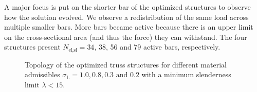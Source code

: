 A major focus is put on the shorter bar of the optimized structures to observe how the solution evolved. We observe a redistribution of the same load across multiple smaller bars. More bars became active because there is an upper limit on the cross-sectional area (and thus the force) they can withstand. The four structures present $N_\text{el,sl}=34$, 38, 56 and 79 active bars, respectively.

\begin{figure}
    \hfill
    \hfill
    \hfill
    \caption{Topology of the optimized truss structures for different material admissibles $\sigma_\text{L}=1.0,0.8,0.3\text{ and }0.2$ with a minimum slenderness limit $\lambda<15$.}
    \label{fig:04_tto_slend}
\end{figure}

